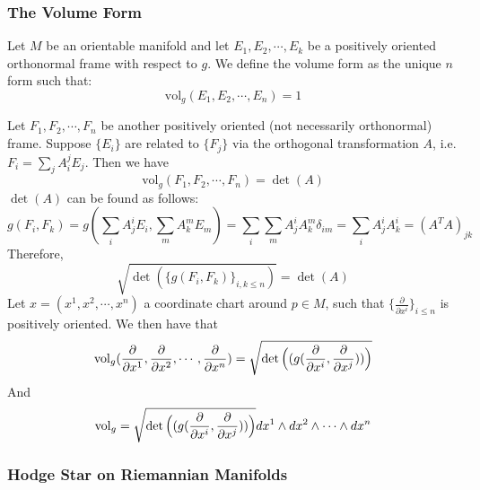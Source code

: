 \subsubsection{The Volume Form}
Let $M$ be an orientable manifold and let $E_1,E_2,\cdots,E_k$ be a positively oriented orthonormal frame with respect to $g$. We define the volume form as the unique $n$ form such that: \begin{equation}\label{def:volume_form_for_riemannian_manifold}
    \mathrm{vol}_g(E_1,E_2,\cdots,E_n)=1
\end{equation}

Let $F_1,F_2,\cdots,F_n$ be another positively oriented (not necessarily orthonormal) frame. Suppose $\{E_i\}$ are related to $\{F_j\}$ via the orthogonal transformation $A$, i.e. $F_i=\sum_j A_i^j E_j$. Then we have \begin{equation}
    \mathrm{vol}_g(F_1,F_2,\cdots,F_n)=\det(A)
\end{equation} 
$\det(A)$ can be found as follows:
$$g(F_i,F_k)=g(\sum_i A_j^i E_i,\sum_m A_k^m E_m)=\sum_i\sum_m A^i_j A^m_k \delta_{im}=\sum_i A^i_j A^i_k =(A^TA)_{jk}$$
Therefore, $$\sqrt{\det(\{g(F_i,F_k)\}_{i,k\leq n})}=\det(A)$$
Let $x=(x^1,x^2,\cdots,x^n)$ a coordinate chart around $p\in M$, such that $\{\frac{\partial}{\partial x^i}\}_{i\leq n}$ is positively oriented. We then have that \begin{equation}
    \mathrm{vol}_g(\frac{\partial}{\partial x^1},\frac{\partial}{\partial x^2},\cdots,\frac{\partial}{\partial x^n})=\sqrt{ \det \Big{(} \bigg.{(} g(\frac{\partial}{\partial x^i},\frac{\partial}{\partial x^j})  \bigg.{)}\Big{)} }
\end{equation}
And \begin{equation}
    \mathrm{vol}_g=\sqrt{ \det \Big{(} \bigg.{(} g(\frac{\partial}{\partial x^i},\frac{\partial}{\partial x^j})  \bigg.{)}\Big{)} }dx^1\wedge dx^2\wedge \cdots \wedge dx^n
\end{equation}
\subsubsection{Hodge Star on Riemannian Manifolds}

